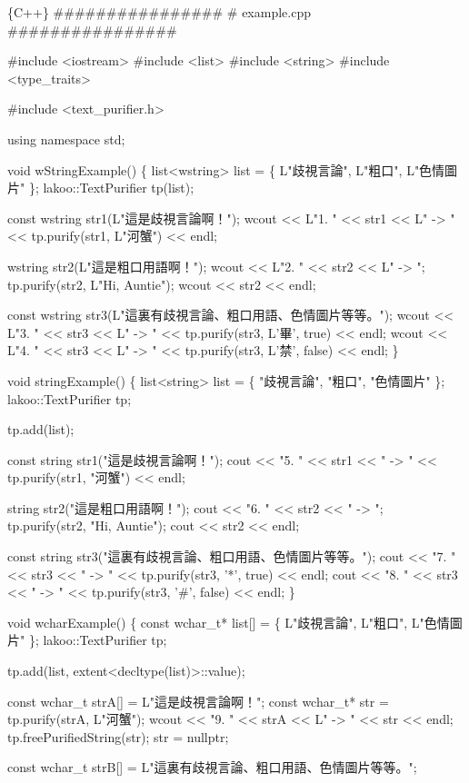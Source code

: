 \begin{DoxyCode}
\{C++\}
################
# example.cpp
################

#include <iostream>
#include <list>
#include <string>
#include <type\_traits>

#include <text\_purifier.h>


using namespace std;


void wStringExample()
\{
    list<wstring> list = \{ L"歧視言論", L"粗口", L"色情圖片" \};
    lakoo::TextPurifier tp(list);

    const wstring str1(L"這是歧視言論啊！");
    wcout << L"1.  " << str1 << L" -> " << tp.purify(str1, L"河蟹") << endl;

    wstring str2(L"這是粗口用語啊！");
    wcout << L"2.  " << str2 << L" -> ";
    tp.purify(str2, L"Hi, Auntie");
    wcout << str2 << endl;

    const wstring str3(L"這裏有歧視言論、粗口用語、色情圖片等等。");
    wcout << L"3.  " << str3 << L" -> " << tp.purify(str3, L'畢', true) << endl;
    wcout << L"4.  " << str3 << L" -> " << tp.purify(str3, L'禁', false) << endl;
\}

void stringExample()
\{
    list<string> list = \{ "歧視言論", "粗口", "色情圖片" \};
    lakoo::TextPurifier tp;

    tp.add(list);

    const string str1("這是歧視言論啊！");
    cout << "5.  " << str1 << " -> " << tp.purify(str1, "河蟹") << endl;

    string str2("這是粗口用語啊！");
    cout << "6.  " << str2 << " -> ";
    tp.purify(str2, "Hi, Auntie");
    cout << str2 << endl;

    const string str3("這裏有歧視言論、粗口用語、色情圖片等等。");
    cout << "7.  " << str3 << " -> " << tp.purify(str3, '*', true) << endl;
    cout << "8.  " << str3 << " -> " << tp.purify(str3, '#', false) << endl;
\}

void wcharExample()
\{
    const wchar\_t* list[] = \{ L"歧視言論", L"粗口", L"色情圖片" \};
    lakoo::TextPurifier tp;

    tp.add(list, extent<decltype(list)>::value);

    const wchar\_t strA[] = L"這是歧視言論啊！";
    const wchar\_t* str = tp.purify(strA, L"河蟹");
    wcout << "9.  " << strA << L" -> " << str << endl;
    tp.freePurifiedString(str);
    str = nullptr;

    const wchar\_t strB[] = L"這裏有歧視言論、粗口用語、色情圖片等等。";


\end{DoxyCode}

